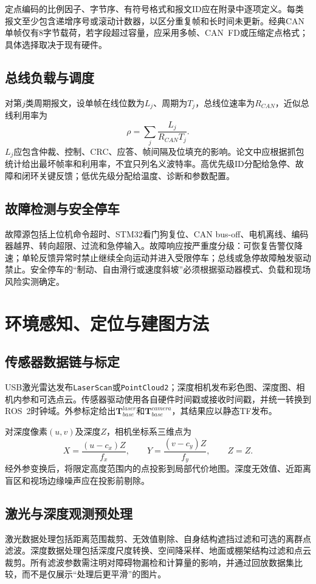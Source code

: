 \documentclass[UTF8,openany,12pt,a4paper]{ctexrep}
\begin{document}
定点编码的比例因子、字节序、有符号格式和报文ID应在附录中逐项定义。每类报文至少包含递增序号或滚动计数器，以区分重复帧和长时间未更新。经典CAN单帧仅有8字节载荷，若字段超过容量，应采用多帧、CAN~FD或压缩定点格式；具体选择取决于现有硬件。

\section{总线负载与调度}
对第$j$类周期报文，设单帧在线位数为$L_j$、周期为$T_j$，总线位速率为$R_{CAN}$，近似总线利用率为
\begin{equation}\rho=\sum_j\frac{L_j}{R_{CAN}T_j}.\end{equation}
$L_j$应包含仲裁、控制、CRC、应答、帧间隔及位填充的影响。论文中应根据抓包统计给出最坏帧率和利用率，不宜只列名义波特率。高优先级ID分配给急停、故障和闭环关键反馈；低优先级分配给温度、诊断和参数配置。

\section{故障检测与安全停车}
故障源包括上位机命令超时、STM32看门狗复位、CAN bus-off、电机离线、编码器越界、转向超限、过流和急停输入。故障响应按严重度分级：可恢复告警仅降速；单轮反馈异常时禁止继续全向运动并进入受限停车；总线或急停故障触发驱动禁止。安全停车的“制动、自由滑行或速度斜坡”必须根据驱动器模式、负载和现场风险实测确定。

\chapter{环境感知、定位与建图方法}
\section{传感器数据链与标定}
USB激光雷达发布\texttt{LaserScan}或\texttt{PointCloud2}；深度相机发布彩色图、深度图、相机内参和可选点云。传感器驱动使用各自硬件时间戳或接收时间戳，并统一转换到ROS~2时钟域。外参标定给出$\bm T_{base}^{laser}$和$\bm T_{base}^{camera}$，其结果应以静态TF发布。

对深度像素$(u,v)$及深度$Z$，相机坐标系三维点为
\begin{equation}X=\frac{(u-c_x)Z}{f_x},\qquad Y=\frac{(v-c_y)Z}{f_y},\qquad Z=Z.\end{equation}
经外参变换后，将限定高度范围内的点投影到局部代价地图。深度无效值、近距离盲区和视场边缘噪声应在投影前剔除。

\section{激光与深度观测预处理}
激光数据处理包括距离范围裁剪、无效值剔除、自身结构遮挡过滤和可选的离群点滤波。深度数据处理包括深度尺度转换、空间降采样、地面或棚架结构过滤和点云裁剪。所有滤波参数需注明对障碍物漏检和计算量的影响，并通过回放数据集比较，而不是仅展示“处理后更平滑”的图片。
\end{document}
